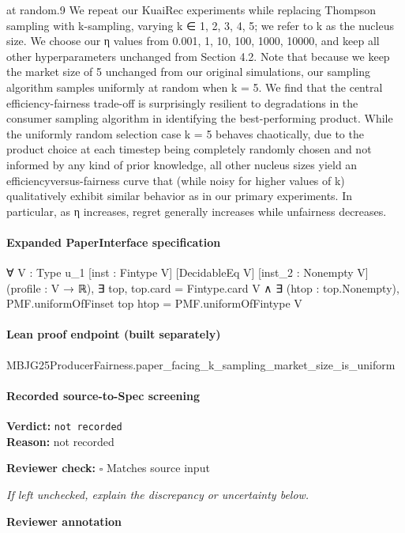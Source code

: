 \documentclass[10pt]{article}
\newcommand{\reviewerbox}{%
  \par\noindent\fbox{\parbox{0.96\linewidth}{\rule{0pt}{0.38in}}}\par
}
\newcommand{\reviewmatch}[1]{%
  \par\noindent\textbf{Reviewer check:} $\square$\; #1\par
  \noindent\emph{If left unchecked, explain the discrepancy or uncertainty below.}\par
}
\begin{document}
\begin{ReviewVerbatim}
at random.9
We repeat our KuaiRec experiments while replacing Thompson sampling with k-sampling, varying k ∈
{1, 2, 3, 4, 5}; we refer to k as the nucleus size. We choose
our η values from {0.001, 1, 10, 100, 1000, 10000}, and
keep all other hyperparameters unchanged from Section 4.2.
Note that because we keep the market size of 5 unchanged
from our original simulations, our sampling algorithm samples uniformly at random when k = 5.
We find that the central efficiency-fairness trade-off is surprisingly resilient to degradations in the consumer sampling
algorithm in identifying the best-performing product. While
the uniformly random selection case k = 5 behaves chaotically, due to the product choice at each timestep being completely randomly chosen and not informed by any kind of
prior knowledge, all other nucleus sizes yield an efficiencyversus-fairness curve that (while noisy for higher values of
k) qualitatively exhibit similar behavior as in our primary
experiments. In particular, as η increases, regret generally
increases while unfairness decreases.
\end{ReviewVerbatim}


\paragraph{Expanded PaperInterface specification}
\begin{ReviewVerbatim}
∀ {V : Type u_1} [inst : Fintype V] [DecidableEq V] [inst_2 : Nonempty V] (profile : V → ℝ),
  ∃ top, top.card = Fintype.card V ∧ ∃ (htop : top.Nonempty), PMF.uniformOfFinset top htop = PMF.uniformOfFintype V
\end{ReviewVerbatim}

\paragraph{Lean proof endpoint (built separately)}\begin{ReviewVerbatim}
MBJG25ProducerFairness.paper_facing_k_sampling_market_size_is_uniform
\end{ReviewVerbatim}

\paragraph{Recorded source-to-Spec screening}
\textbf{Verdict:} \texttt{not recorded}
\\
\textbf{Reason:} not recorded
\reviewmatch{Matches source input}
\noindent\textbf{Reviewer annotation}\par
\reviewerbox
\end{document}
